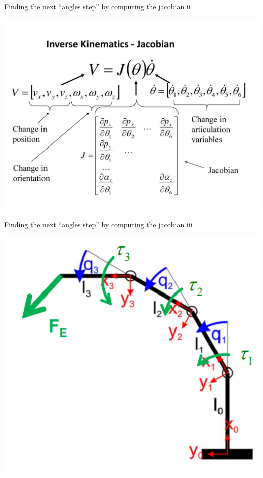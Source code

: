 \documentclass{beamer}
\begin{document}
\begin{frame}{Finding the next ``angles step'' by computing the jacobian ii}

\includegraphics[scale = 1.2]{slide_31.jpg}\cite{5}
\end{frame}

\begin{frame}{Finding the next ``angles step'' by computing the jacobian iii}

\includegraphics[scale = 0.7]{eth1.PNG}\cite{6}
\end{frame}
\end{document}
